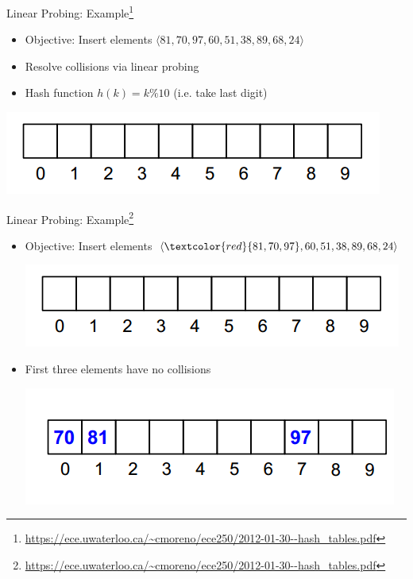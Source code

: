 \documentclass{beamer}
\begin{document}
\begin{frame}{Linear Probing: Example\footnote{\url{https://ece.uwaterloo.ca/~cmoreno/ece250/2012-01-30--hash_tables.pdf}}}
    \begin{itemize}
        \item Objective: Insert elements $\langle 81, 70, 97, 60, 51, 38, 89, 68, 24 \rangle$ 
        \item Resolve collisions via linear probing 
        \item Hash function $h(k) = k \% 10$ (i.e. take last digit)
    \end{itemize}
    \begin{center}
        \includegraphics[scale=0.5]{linearProbing1.png}
    \end{center}
\end{frame}

\begin{frame}{Linear Probing: Example\footnote{\url{https://ece.uwaterloo.ca/~cmoreno/ece250/2012-01-30--hash_tables.pdf}}}
    \begin{itemize}
        \item Objective: Insert elements $\langle \textcolor{red}{81, 70, 97}, 60, 51, 38, 89, 68, 24 \rangle$ 
        \begin{center}
            \includegraphics[scale=0.5]{linearProbing1.png}
        \end{center}
        \item First three elements have no collisions \pause
        \begin{center}
            \includegraphics[scale=0.5]{linearProbing2.png}
        \end{center}
    \end{itemize}
\end{frame}
\end{document}
